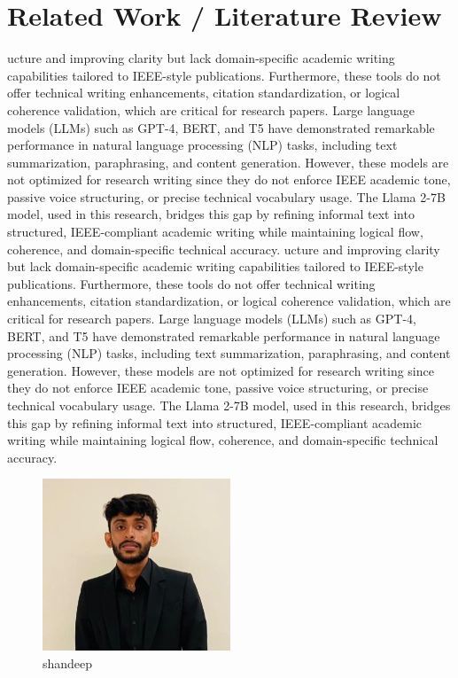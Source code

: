 \documentclass[conference]{IEEEtran}
\begin{document}
  

  

  
    \section{Related Work / Literature Review}
    ucture and improving clarity but lack domain-specific academic writing capabilities tailored to IEEE-style publications. Furthermore, these tools do not offer technical writing enhancements, citation standardization, or logical coherence validation, which are critical for research papers.
Large language models (LLMs) such as GPT-4, BERT, and T5 have demonstrated remarkable performance in natural language processing (NLP) tasks, including text summarization, paraphrasing, and content generation. However, these models are not optimized for research writing since they do not enforce IEEE academic tone, passive voice structuring, or precise technical vocabulary usage. The Llama 2-7B model, used in this research, bridges this gap by refining informal text into structured, IEEE-compliant academic writing while maintaining logical flow, coherence, and domain-specific technical accuracy.
ucture and improving clarity but lack domain-specific academic writing capabilities tailored to IEEE-style publications. Furthermore, these tools do not offer technical writing enhancements, citation standardization, or logical coherence validation, which are critical for research papers.
Large language models (LLMs) such as GPT-4, BERT, and T5 have demonstrated remarkable performance in natural language processing (NLP) tasks, including text summarization, paraphrasing, and content generation. However, these models are not optimized for research writing since they do not enforce IEEE academic tone, passive voice structuring, or precise technical vocabulary usage. The Llama 2-7B model, used in this research, bridges this gap by refining informal text into structured, IEEE-compliant academic writing while maintaining logical flow, coherence, and domain-specific technical accuracy.

\begin{figure}[h]
\centering
\includegraphics[width=0.5\textwidth]{..//uploads/1740312088464.jpg}
\caption{shandeep}
\end{figure}


    
  

  




\begin{thebibliography}{1}

  
    
  
    
  

\end{thebibliography}
\end{document}
